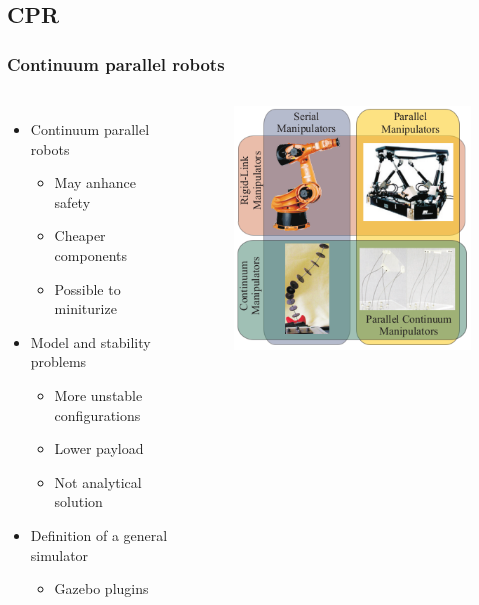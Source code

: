 \documentclass[compress]{thesisbeamer}
\begin{document}
        \subsection{CPR}
        \begin{frame}
        	\frametitle{Continuum parallel robots}
			\begin{columns}
			\begin{itemize}%
  				\item Continuum parallel robots 
  				\begin{itemize}%
   					\item May anhance safety
   					\item Cheaper components 
   					\item Possible to miniturize
  				\end{itemize}
  				\item Model and stability problems
  				\begin{itemize}%
   					\item More unstable configurations
   					\item Lower payload
   					\item Not analytical solution
  				\end{itemize}
  				\item Definition of a general simulator
  				\begin{itemize}
  					\item Gazebo plugins
  				\end{itemize}
 			\end{itemize}
			\vspace{2cm}
			\begin{figure}[h]
				\centering
				\includegraphics[width=\textwidth]{images/serial_parall_robots}

\end{figure}
\end{columns}
\end{frame}
\end{document}
